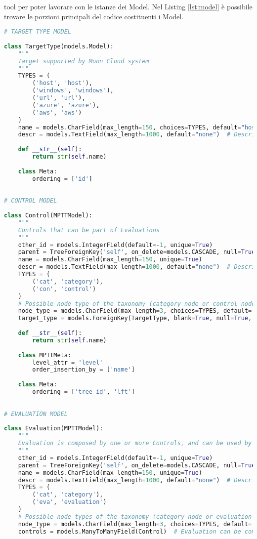 tool per poter lavorare con le istanze dei Model. Nel Listing \ref{lst:model} è possibile trovare le porzioni principali del 
codice costituenti i Model.
%
\lstset{style=python_code_style}
\begin{lstlisting}[language=Python, label=lst:model, caption={Parti principali del codice che costituiscono i Model della soluzione.}]
# TARGET TYPE MODEL
 
class TargetType(models.Model):
    """
    Target supported by Moon Cloud system
    """
    TYPES = (
        ('host', 'host'),
        ('windows', 'windows'),
        ('url', 'url'),
        ('azure', 'azure'),
        ('aws', 'aws')
    )
    name = models.CharField(max_length=150, choices=TYPES, default="host")
    descr = models.TextField(max_length=1000, default="none")  # Description of a target
 
    def __str__(self):
        return str(self.name)
 
    class Meta:
        ordering = ['id']
 
 
# CONTROL MODEL
 
class Control(MPTTModel):
    """
    Controls that can be part of Evaluations
    """
    other_id = models.IntegerField(default=-1, unique=True)
    parent = TreeForeignKey('self', on_delete=models.CASCADE, null=True, blank=True, related_name='children')
    name = models.CharField(max_length=150, unique=True)
    descr = models.TextField(max_length=1000, default="none")  # Description of a node in the taxonomy
    TYPES = (
        ('cat', 'category'),
        ('con', 'control')
    )
    # Possible node type of the taxonomy (category node or control node)
    node_type = models.CharField(max_length=3, choices=TYPES, default='cat')
    target_type = models.ForeignKey(TargetType, blank=True, null=True, on_delete=models.CASCADE)  # It's null for the root node and category nodes
 
    def __str__(self):
        return str(self.name)
 
    class MPTTMeta:
        level_attr = 'level'
        order_insertion_by = ['name']
 
    class Meta:
        ordering = ['tree_id', 'lft']
 
 
# EVALUATION MODEL
 
class Evaluation(MPTTModel):
    """
    Evaluation is composed by one or more Controls, and can be used by Users
    """
    other_id = models.IntegerField(default=-1, unique=True)
    parent = TreeForeignKey('self', on_delete=models.CASCADE, null=True, blank=True, related_name='children')
    name = models.CharField(max_length=150, unique=True)
    descr = models.TextField(max_length=1000, default="none")  # Description of a node in the taxonomy
    TYPES = (
        ('cat', 'category'),
        ('eva', 'evaluation')
    )
    # Possible node types of the taxonomy (category node or evaluation node)
    node_type = models.CharField(max_length=3, choices=TYPES, default='cat')
    controls = models.ManyToManyField(Control)  # Evaluation can be composed of one or more controls
 

\end{lstlisting}
